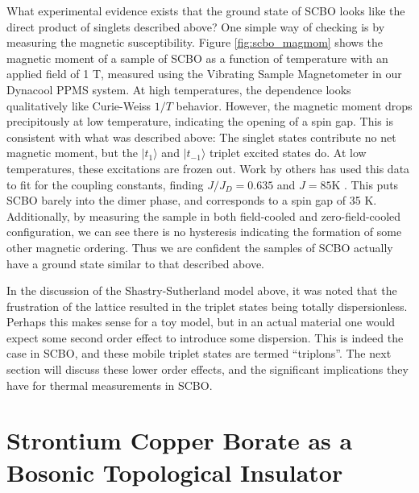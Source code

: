\documentclass{thesis-umich}
\begin{document}
What experimental evidence exists that the ground state of SCBO looks like the direct product of singlets described above? One simple way of checking is by measuring the magnetic susceptibility. Figure \ref{fig:scbo_magmom} shows the magnetic moment of a sample of SCBO as a function of temperature with an applied field of 1 T, measured using the Vibrating Sample Magnetometer in our Dynacool PPMS system. At high temperatures, the dependence looks qualitatively like Curie-Weiss $1/T$ behavior. However, the magnetic moment drops precipitously at low temperature, indicating the opening of a spin gap. This is consistent with what was described above: The singlet states contribute no net magnetic moment, but the $|t_1\rangle$ and $|t_{-1}\rangle$ triplet excited states do. At low temperatures, these excitations are frozen out. Work by others has used this data to fit for the coupling constants, finding $J/J_D = 0.635$ and $J = 85$K \cite{Miyahara2000}. This puts SCBO barely into the dimer phase, and corresponds to a spin gap of 35 K. Additionally, by measuring the sample in both field-cooled and zero-field-cooled configuration, we can see there is no hysteresis indicating the formation of some other magnetic ordering. Thus we are confident the samples of SCBO actually have a ground state similar to that described above.

In the discussion of the Shastry-Sutherland model above, it was noted that the frustration of the lattice resulted in the triplet states being totally dispersionless. Perhaps this makes sense for a toy model, but in an actual material one would expect some second order effect to introduce some dispersion. This is indeed the case in SCBO, and these mobile triplet states are termed ``triplons''. The next section will discuss these lower order effects, and the significant implications they have for thermal measurements in SCBO.

\section{Strontium Copper Borate as a Bosonic Topological Insulator}
\end{document}
